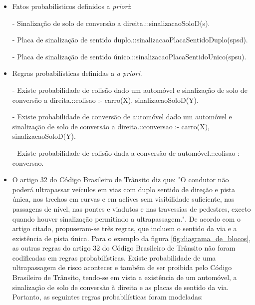 \documentclass[
	12pt,				%
    oneside,			%
	a4paper,			%
	english,			%
	french,				%
	spanish,			%
	brazil,				%
	]{abntex2}
\begin{document}
\begin{enumerate}
\begin{itemize}
            \item Fatos probabilísticos definidos a \textit{priori}:\newline
            
            - Sinalização de solo de conversão a direita.::sinalizacaoSoloD(s).\newline

            - Placa de sinalização de sentido duplo.::sinalizacaoPlacaSentidoDuplo(spsd).\newline
            
            - Placa de sinalização de sentido único.::sinalizacaoPlacaSentidoUnico(spsu).\newline

            \item Regras probabilísticas definidas a \textit{a priori}.\newline


            - Existe probabilidade de colisão dado um automóvel e sinalização de solo de conversão a direita.::colisao :- carro(X), sinalizacaoSoloD(Y).\newline
            
            - Existe probabilidade de conversão de automóvel dado um automóvel e sinalização de solo de conversão a direita.::conversao :- carro(X), sinalizacaoSoloD(Y).\newline
            
            - Existe probabilidade de colisão dada a conversão de automóvel.::colisao :- conversao.\newline

           \item O artigo 32 do Código Brasileiro de Trânsito diz que: "O condutor não poderá ultrapassar veículos em vias com duplo sentido de direção e pista única, nos trechos em curvas e em aclives sem visibilidade suficiente, nas passagens de nível, nas pontes e viadutos e nas travessias de pedestres, exceto quando houver sinalização permitindo a ultrapassagem.". De acordo com o artigo citado, propuseram-se três regras, que incluem o sentido da via e a existência de pista única. Para o exemplo da figura  \ref{fig:diagrama_de_blocos}, as outras regras do artigo 32 do Código Brasileiro de Trânsito não foram codificadas em regras probabilísticas. Existe probabilidade de uma ultrapassagem de risco acontecer e também de ser proibida pelo Código Brasileiro de Trânsito, tendo-se em vista a existência de um automóvel, a sinalização de solo de conversão à direita e as placas de sentido da via. Portanto, as seguintes regras probabilísticas foram modeladas:\newline
           

\end{itemize}
\end{enumerate}
\end{document}
